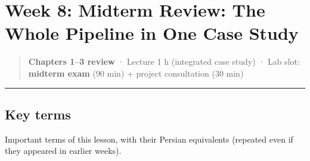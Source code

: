 \section{Week 8: Midterm Review: The Whole Pipeline in One Case Study}

\begin{quote}
\textbf{Chapters 1--3 review} · Lecture 1 h (integrated case study) ·
Lab slot: \textbf{midterm exam} (90 min) + project consultation (30 min)
\end{quote}

\begin{center}\rule{0.5\linewidth}{0.5pt}\end{center}

\subsection{Key terms}

Important terms of this lesson, with their Persian equivalents (repeated
even if they appeared in earlier weeks).

